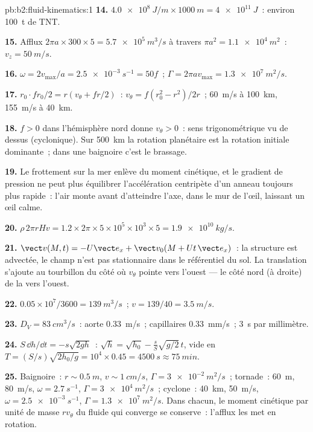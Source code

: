 \begin{solution}{pb:b2:fluid-kinematics:1}
\textbf{14.} $\qty{4.0e8}{J/m} \times \qty{1000}{m} = \qty{4e11}{J}$~: environ
\qty{100}{t} de TNT.

\textbf{15.} Afflux $2\pi a \times 300 \times 5 = \qty{5.7e5}{m^3/s}$ à travers
$\pi a^2 = \qty{1.1e4}{m^2}$~: $v_z = \qty{50}{m/s}$.

\textbf{16.} $\omega = 2v_{\max}/a = \qty{2.5e-3}{s^{-1}} = 50f$~; $\Gamma = 2\pi av_{\max}
= \qty{1.3e7}{m^2/s}$.

\textbf{17.} $r_0\cdot fr_0/2 = r(v_\theta + fr/2)$~: $v_\theta = f(r_0^2 - r^2)/2r$~;
\qty{60}{m/s} à \qty{100}{km}, \qty{155}{m/s} à \qty{40}{km}.

\textbf{18.} $f > 0$ dans l'hémisphère nord donne $v_\theta > 0$~:
sens trigonométrique vu de dessus (cyclonique). Sur \qty{500}{km} la
rotation planétaire est la rotation initiale dominante~; dans une baignoire c'est le
brassage.

\textbf{19.} Le frottement sur la mer enlève du moment cinétique, et le
gradient de pression ne peut plus équilibrer l'accélération centripète d'un
anneau toujours plus rapide~: l'air monte avant d'atteindre l'axe, dans le mur
de l'œil, laissant un œil calme.

\textbf{20.} $\rho\,2\pi rHv = 1.2 \times 2\pi \times 5 \times 10^5 \times 10^3 \times 5 =
\qty{1.9e10}{kg/s}$.

\textbf{21.} $\vect v(M, t) = -U\vect e_x + \vect v_0(M + Ut\,\vect e_x)$~: la
structure est advectée, le champ n'est pas stationnaire dans le référentiel du sol.
La translation s'ajoute au tourbillon du côté où $v_\theta$ pointe vers
l'ouest --- le côté nord (à droite) de la  vers l'ouest.

\textbf{22.} $0.05 \times 10^7/3600 = \qty{139}{m^3/s}$~; $v = 139/40 = \qty{3.5}{m/s}$.

\textbf{23.} $D_V = \qty{83}{cm^3/s}$~: aorte \qty{0.33}{m/s}~; capillaires
\qty{0.33}{mm/s}~; \qty{3}{s} par millimètre.

\textbf{24.} $S\,\dd h/\dd t = -s\sqrt{2gh}$~: $\sqrt h = \sqrt{h_0} -
\frac sS\sqrt{g/2}\,t$, vide en $T = (S/s)\sqrt{2h_0/g} = 10^4 \times 0.45 =
\qty{4500}{s} \approx \qty{75}{min}$.

\textbf{25.} Baignoire~: $r \sim \qty{0.5}{m}$, $v \sim \qty{1}{cm/s}$, $\Gamma =
\qty{3e-2}{m^2/s}$~; tornade~: \qty{60}{m}, \qty{80}{m/s}, $\omega = \qty{2.7}{s^{-1}}$,
$\Gamma = \qty{3e4}{m^2/s}$~; cyclone~: \qty{40}{km}, \qty{50}{m/s}, $\omega =
\qty{2.5e-3}{s^{-1}}$, $\Gamma = \qty{1.3e7}{m^2/s}$. Dans chacun, le moment
cinétique par unité de masse $rv_\theta$ du fluide qui converge se conserve~:
l'afflux les met en rotation.
\end{solution}
